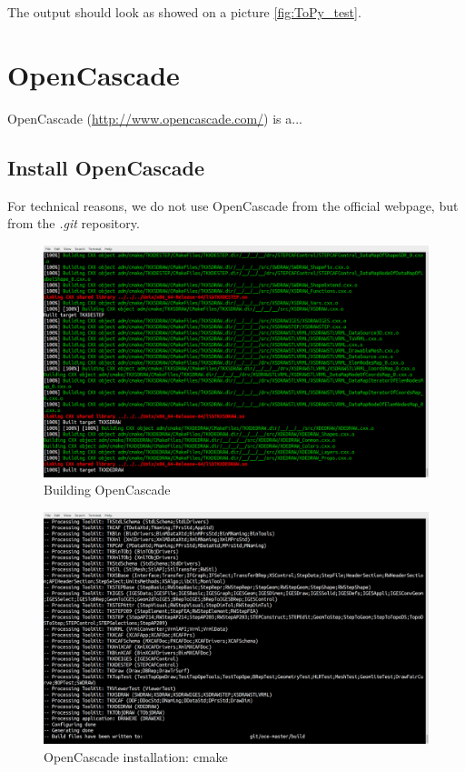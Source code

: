 \documentclass[11pt,a4paper,bibtotoc,idxtotoc,headsepline,footsepline,footexclude,DIV13,oneside]{scrbook}
\begin{document}
The output should look as showed on a picture \ref{fig:ToPy_test}.


\chapter{OpenCascade}
\label{OpenCascade}
OpenCascade (\href{http://www.opencascade.com/}{http://www.opencascade.com/}) is a... 
\section{Install OpenCascade}
For technical reasons, we do not use OpenCascade from the official webpage, but from the \textit{.git} repository. 
\begin{figure}
\centering
\includegraphics[scale=0.2]{img/OC_Build5.png}
\caption{Building OpenCascade}
\label{fig:OC_build}
\end{figure}
\begin{figure}
\centering
\includegraphics[scale=0.3]{img/OC_CMake2.png}
\caption{OpenCascade installation: cmake}
\label{fig:OC_cmake}
\end{figure}
\end{document}
